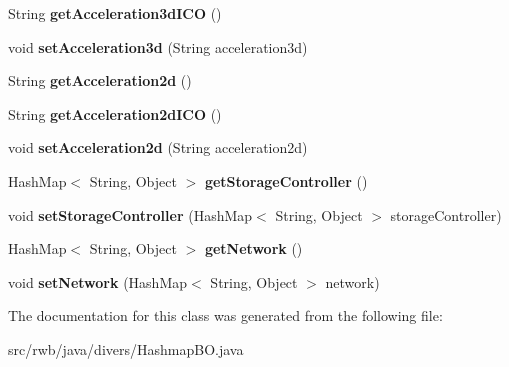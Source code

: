\begin{DoxyCompactItemize}
String {\bfseries get\+Acceleration3d\+I\+CO} ()
\item 
\mbox{\label{classrwb_1_1java_1_1divers_1_1_hashmap_b_o_a6ce7f088f1a31f418d2950f7294f7d30}} 
void {\bfseries set\+Acceleration3d} (String acceleration3d)
\item 
\mbox{\label{classrwb_1_1java_1_1divers_1_1_hashmap_b_o_a7621e280a5bcb27d495d5f4bc116a866}} 
String {\bfseries get\+Acceleration2d} ()
\item 
\mbox{\label{classrwb_1_1java_1_1divers_1_1_hashmap_b_o_ace8d3c504d2c0b78fbc682f761d24f81}} 
String {\bfseries get\+Acceleration2d\+I\+CO} ()
\item 
\mbox{\label{classrwb_1_1java_1_1divers_1_1_hashmap_b_o_adc9fc70f1d9e9ff21b7b2c755a6c2e80}} 
void {\bfseries set\+Acceleration2d} (String acceleration2d)
\item 
\mbox{\label{classrwb_1_1java_1_1divers_1_1_hashmap_b_o_a128aa9868c647626c245fbb68cfe36eb}} 
Hash\+Map$<$ String, Object $>$ {\bfseries get\+Storage\+Controller} ()
\item 
\mbox{\label{classrwb_1_1java_1_1divers_1_1_hashmap_b_o_a98694d312d4e27ae753eb103c70fc111}} 
void {\bfseries set\+Storage\+Controller} (Hash\+Map$<$ String, Object $>$ storage\+Controller)
\item 
\mbox{\label{classrwb_1_1java_1_1divers_1_1_hashmap_b_o_a61647f088583c4a158a576589602047c}} 
Hash\+Map$<$ String, Object $>$ {\bfseries get\+Network} ()
\item 
\mbox{\label{classrwb_1_1java_1_1divers_1_1_hashmap_b_o_a88b1091304591670b1fa031da936bdf6}} 
void {\bfseries set\+Network} (Hash\+Map$<$ String, Object $>$ network)
\end{DoxyCompactItemize}


The documentation for this class was generated from the following file\+:\begin{DoxyCompactItemize}
\item 
src/rwb/java/divers/Hashmap\+B\+O.\+java\end{DoxyCompactItemize}
